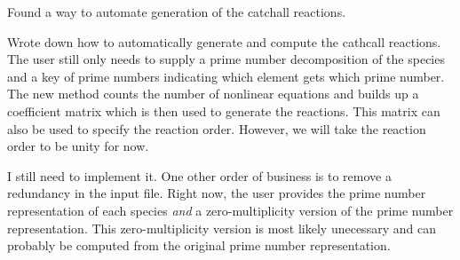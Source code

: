 \documentclass[fontsize=11pt, %
               paper=a4, %
               oneside, %
               captions=tableheading,
               index=totoc,
               hyperref]{labbook}
\begin{document}
Found a way to automate generation of the catchall reactions.

Wrote down how to automatically generate and compute the cathcall reactions.  The user still only needs to supply a prime number decomposition of the species and a key of prime numbers indicating which element gets which prime number.  The new method counts the number of nonlinear equations and builds up a coefficient matrix which is then used to generate the reactions.  This matrix can also be used to specify the reaction order.  However, we will take the reaction order to be unity for now.

I still need to implement it.  One other order of business is to remove a redundancy in the input file.  Right now, the user provides the prime number representation of each species \textit{and} a zero-multiplicity version of the prime number representation.  This zero-multiplicity version is most likely unecessary and can probably be computed from the original prime number representation.

\end{document}
